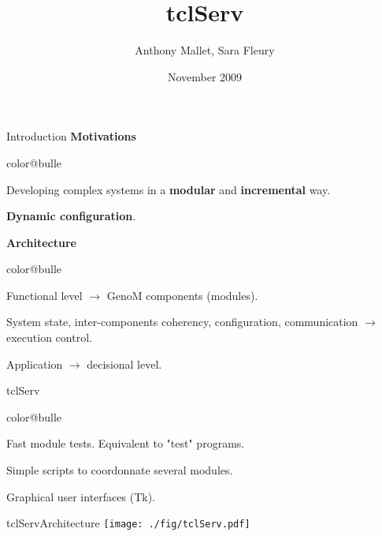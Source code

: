 \documentclass[a4paper,landscape,smooth]{show}
\title{\Huge tclServ}
\author{Anthony Mallet, Sara Fleury}
\date{November 2009}
\begin{document}
\maketitle

\def\figurepath{./:./fig}
\graphicspath{{./:./fig/}}


\begin{part}{Introduction}{}
   \vfill
   {\bf Motivations}
   \begin{bitemize}{color@bulle}
      \item Developing complex systems in a {\bf modular} and
	    {\bf incremental} way.
      \item {\bf Dynamic configuration}.
   \end{bitemize}
   \vfill
   {\bf Architecture}
   \begin{bitemize}{color@bulle}
      \item  Functional level $\rightarrow$ GenoM components (modules).
      \item System state,  inter-components coherency, configuration,
	    communication $\rightarrow$ execution control.
      \item Application $\rightarrow$ decisional level.
   \end{bitemize}
   \vfill
\end{part}

\begin{tslide}{tclServ}
   \vfill
   \begin{bitemize}{color@bulle}
      \item Fast module tests. Equivalent to
	    "test" programs.
      \item Simple scripts to coordonnate several modules.
      \item Graphical user interfaces (Tk).
   \end{bitemize}
   \vfill
\end{tslide}


\begin{part}{tclServ}{Architecture}
   \vfill
    \texttt{[image: ./fig/tclServ.pdf]}
   \vfill
\end{part}

\end{document}
